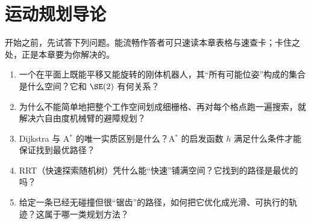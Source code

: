 \chapter{运动规划导论}
\label{ch:planning}


\begin{practice}[前置自测]
开始之前，先试答下列问题。能流畅作答者可只速读本章表格与速查卡；卡住之处，正是本章要为你解决的。
\begin{enumerate}
  \item 一个在平面上既能平移又能旋转的刚体机器人，其“所有可能位姿”构成的集合是什么空间？它和 $\SE(2)$ 有何关系？
  \item 为什么不能简单地把整个工作空间划成细栅格、再对每个格点跑一遍搜索，就解决六自由度机械臂的避障规划？
  \item Dijkstra 与 A$^*$ 的唯一实质区别是什么？A$^*$ 的启发函数 $h$ 满足什么条件才能保证找到最优路径？
  \item RRT（快速探索随机树）凭什么能“快速”铺满空间？它找到的路径是最优的吗？
  \item 给定一条已经无碰撞但很“锯齿”的路径，如何把它优化成光滑、可执行的轨迹？这属于哪一类规划方法？
\end{enumerate}
\end{practice}

